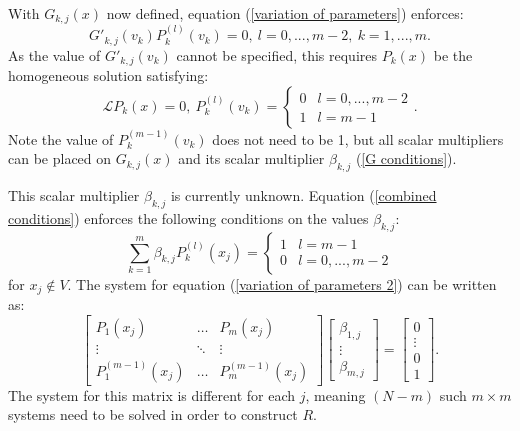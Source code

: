 \documentclass{article}
\begin{document}
With $G_{k,j}(x)$ now defined, equation (\ref{variation of parameters}) enforces:
\begin{equation}
G'_{k,j}(v_k) P_k^{(l)}(v_k) = 0, \ l = 0,...,m-2, \ k = 1,...,m .
\end{equation}
As the value of $G'_{k,j}(v_k)$ cannot be specified, this requires $P_k(x)$ be the homogeneous solution satisfying: %
\begin{equation} \label{homog solns}
\mathcal{L}P_k(x) = 0, \ P_k^{(l)}(v_k) = \begin{cases} 0 & l = 0,...,m-2 \\ 1 & l = m-1 \end{cases} .
\end{equation}
Note the value of $P_k^{(m-1)}(v_k)$ does not need to be 1, but all scalar multipliers can be placed on $G_{k,j}(x)$ and its scalar multiplier $\beta_{k,j}$ (\ref{G conditions}).

This scalar multiplier $\beta_{k,j}$ is currently unknown.
Equation (\ref{combined conditions}) enforces the following conditions on the values $\beta_{k,j}$:
\begin{equation} \label{variation of parameters 2}
\sum_{k=1}^m \beta_{k,j} P_k^{(l)}(x_j) = \begin{cases} 1 & l = m-1 \\ 0 & l =0,...,m-2 \end{cases}
\end{equation}
for $x_j \notin V$.
The system for equation (\ref{variation of parameters 2}) can be written as:
\begin{equation} \label{eq:betas}
\begin{bmatrix} P_1(x_j) & \dots & P_m(x_j)
\\ \vdots & \ddots & \vdots
\\ P_1^{(m-1)}(x_j) & \dots & P_m^{(m-1)}(x_j) \end{bmatrix}
\begin{bmatrix} \beta_{1,j} \\ \vdots \\ \beta_{m,j} \end{bmatrix} =
\begin{bmatrix} 0 \\ \vdots \\ 0 \\ 1 \end{bmatrix} .
\end{equation}
The system for this matrix is different for each $j$, meaning $(N - m)$ such $m \times m$ systems need to be solved in order to construct $R$.
\end{document}

